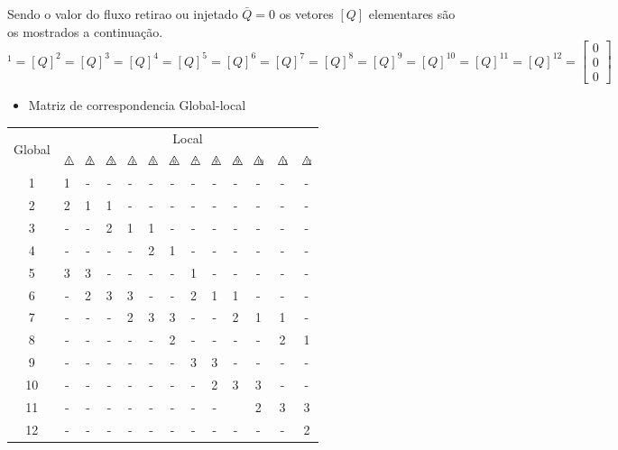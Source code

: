 \documentclass{article} %
\newcommand{\trinum}[1]{%
	\triangle\hspace{-.57em}\raisebox{0.1em}{\scalebox{.5}{#1}}
}
\begin{document}
Sendo o valor do fluxo retirao ou injetado \(\bar{Q}=0\) os vetores \([Q]\) elementares são os mostrados a continuação.
\begin{equation*}
[{Q}]^{1}=[{Q}]^{2}=[{Q}]^{3}=[{Q}]^{4}=[{Q}]^{5}=[{Q}]^{6}=[{Q}]^{7}=[{Q}]^{8}=[{Q}]^{9}=[{Q}]^{10}=[{Q}]^{11}=[{Q}]^{12}=\begin{bmatrix}
0\\0\\0
\end{bmatrix}
\end{equation*}
\begin{itemize}
	\item Matriz de correspondencia Global-local
\end{itemize}



\begin{table}[H]
	\centering
	\begin{tabular}{@{}ccccccccccccc@{}}
		\toprule
		\multirow{2}{*}{Global} & \multicolumn{12}{c}{Local} \\ \cmidrule(l){2-13} 
		& $\trinum{1}$& $\trinum{2}$ & $\trinum{3}$ & $\trinum{4}$ &$\trinum{5}$ &$\trinum{6}$ &$\trinum{7}$ &$\trinum{8}$ &$\trinum{9}$ &$\trinum{10}$ &$\trinum{11}$ &$\trinum{12}$ \\ \midrule
		1 & 1 & - & - & - & - & - & - & -& - & - & - & -\\
		2 & 2 & 1 & 1& -& - & - & - & -& - & - & - & - \\
		3 & - & - & 2 & 1& 1 & - & - & -& - & - & - & - \\
		4 & - & -& - & - & 2 & 1& - & -& - & - & - & -\\
		5 & 3 & 3 & - & -& - & - & 1 & -& - & - & - & - \\
		6 & - & 2 & 3 & 3& - & - & 2 & 1& 1 & - & - & -\\
		7 & - & - & - & 2 & 3 & 3 & - & -& 2 & 1 & 1 & -\\
		8 & - & - & - & -& - & 2 & - & -& -& - & 2 & 1 \\
		9 & - & - & - & - & - & - & 3 & 3&- & - & - & -\\
		10 & - & - & - & - & -& - & - & 2& 3 & 3 & - & -\\
		11 & - & - & - & - & -& - & - & -&  & 2 & 3 & 3\\
		12 & - & - & - & - & - & - & - & -& - & - & - & 2\\ \bottomrule
	\end{tabular}
\end{table}
\end{document}
